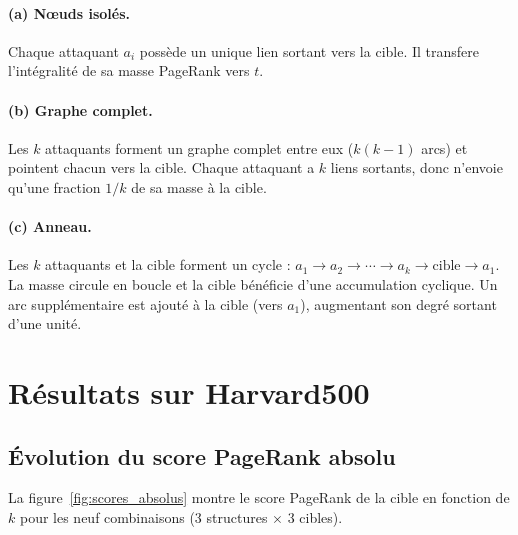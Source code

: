 \documentclass[12pt,a4paper]{article}
\theoremstyle{definition}
\begin{document}
\paragraph{(a) N\oe{}uds isol\'{e}s.}
Chaque attaquant $a_i$ poss\`{e}de un unique lien sortant vers la cible. Il
transfere l'int\'{e}gralit\'{e} de sa masse PageRank vers $t$.

\paragraph{(b) Graphe complet.}
Les $k$ attaquants forment un graphe complet entre eux ($k(k-1)$ arcs) et
pointent chacun vers la cible. Chaque attaquant a $k$ liens sortants, donc
n'envoie qu'une fraction $1/k$ de sa masse \`{a} la cible.

\paragraph{(c) Anneau.}
Les $k$ attaquants et la cible forment un cycle :
$a_1 \to a_2 \to \cdots \to a_k \to \text{cible} \to a_1$.
La masse circule en boucle et la cible b\'{e}n\'{e}ficie d'une accumulation cyclique.
Un arc suppl\'{e}mentaire est ajout\'{e} \`{a} la cible (vers $a_1$), augmentant son
degr\'{e} sortant d'une unit\'{e}.

\section{R\'{e}sultats sur Harvard500}

\subsection{\'{E}volution du score PageRank absolu}

La figure~\ref{fig:scores_absolus} montre le score PageRank de la cible
en fonction de $k$ pour les neuf combinaisons (3 structures $\times$ 3 cibles).
\end{document}
